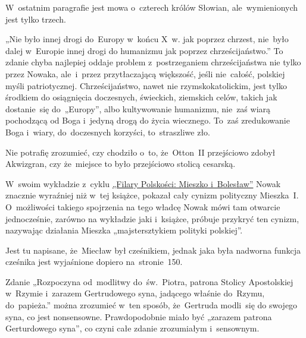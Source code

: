 \documentclass[a4paper,11pt]{article}
\numberwithin{equation}{section}
\begin{document}
 W~ostatnim paragrafie jest mowa o~czterech królów
Słowian, ale~wymienionych jest tylko trzech.

\VerSpaceFour



 „Nie było innej drogi do~Europy w~końcu X~w.
jak poprzez chrzest, nie~było dalej w~Europie innej drogi do humanizmu
jak poprzez chrześcijaństwo.” To zdanie chyba najlepiej oddaje
problem z~postrzeganiem chrześcijaństwa nie tylko przez Nowaka,
ale~i~przez przytłaczającą większość, jeśli nie~całość, polskiej myśli
patriotycznej. Chrześcijaństwo, nawet nie rzymskokatolickim,
jest tylko środkiem do osiągnięcia doczesnych, świeckich, ziemskich
celów, takich jak dostanie~się do~„Europy”, albo kultywowanie
humanizmu, nie~zaś wiarą pochodzącą od Boga i~jedyną drogą do życia
wiecznego. To~zaś zredukowanie Boga i~wiary, do~doczesnych korzyści,
to~straszliwe zło.

\VerSpaceFour





 Nie potrafię zrozumieć, czy chodziło o~to,
że~Otton~II przejściowo zdobył Akwizgran, czy że~miejsce to było
przejściowo stolicą cesarską.

\VerSpaceFour





 W~swoim wykładzie z~cyklu
\href{https://www.youtube.com/watch?v=QovVLT2fitc}{„Filary Polskości:
  Mieszko i~Bolesław”} Nowak znacznie wyraźniej niż w~tej książce,
pokazał cały cynizm polityczny Mieszka~I. O~możliwości takiego
spojrzenia na tego władcę Nowak mówi tam otwarcie jednocześnie,
zarówno na wykładzie jaki i~książce, próbuje przykryć ten cynizm,
nazywając działania Mieszka „majstersztykiem polityki polskiej”.

\VerSpaceFour





 Jest tu napisane, że~Miecław był cześnikiem,
jednak jaka była nadworna funkcja cześnika jest wyjaśnione dopiero
na~stronie~150.

\VerSpaceFour





 Zdanie „Rozpoczyna od~modlitwy
do~św.~Piotra, patrona Stolicy Apostolskiej w~Rzymie i~zarazem
Gertrudowego syna, jadącego właśnie do~Rzymu, do~papieża.” można
zrozumieć w~ten sposób, że~Gertruda modli~się do swojego syna, co jest
nonsensowne. Prawdopodobnie miało być „zarazem patrona Gerturdowego
syna”, co czyni całe zdanie zrozumiałym i~sensownym.
\end{document}
